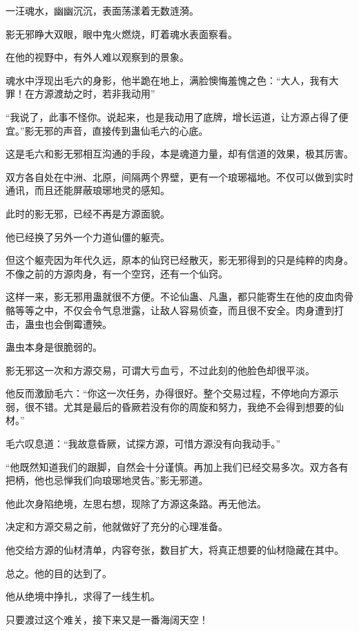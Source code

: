 
\begin{this_body}

一汪魂水，幽幽沉沉，表面荡漾着无数涟漪。

影无邪睁大双眼，眼中鬼火燃烧，盯着魂水表面察看。

在他的视野中，有外人难以观察到的景象。

魂水中浮现出毛六的身影，他半跪在地上，满脸懊悔羞愧之色：“大人，我有大罪！在方源渡劫之时，若非我动用”

“我说了，此事不怪你。说起来，也是我动用了底牌，增长运道，让方源占得了便宜。”影无邪的声音，直接传到蛊仙毛六的心底。

这是毛六和影无邪相互沟通的手段，本是魂道力量，却有信道的效果，极其厉害。

双方各自处在中洲、北原，间隔两个界壁，更有一个琅琊福地。不仅可以做到实时通讯，而且还能屏蔽琅琊地灵的感知。

此时的影无邪，已经不再是方源面貌。

他已经换了另外一个力道仙僵的躯壳。

但这个躯壳因为年代久远，原本的仙窍已经散灭，影无邪得到的只是纯粹的肉身。不像之前的方源肉身，有一个空窍，还有一个仙窍。

这样一来，影无邪用蛊就很不方便。不论仙蛊、凡蛊，都只能寄生在他的皮血肉骨骼等等之中，不仅会令气息泄露，让敌人容易侦查，而且很不安全。肉身遭到打击，蛊虫也会倒霉遭殃。

蛊虫本身是很脆弱的。

影无邪这一次和方源交易，可谓大亏血亏，不过此刻的他脸色却很平淡。

他反而激励毛六：“你这一次任务，办得很好。整个交易过程，不停地向方源示弱，很不错。尤其是最后的昏厥若没有你的周旋和努力，我绝不会得到想要的仙材。”

毛六叹息道：“我故意昏厥，试探方源，可惜方源没有向我动手。”

“他既然知道我们的跟脚，自然会十分谨慎。再加上我们已经交易多次。双方各有把柄，他也忌惮我们向琅琊地灵告。”影无邪道。

他此次身陷绝境，左思右想，现除了方源这条路。再无他法。

决定和方源交易之前，他就做好了充分的心理准备。

他交给方源的仙材清单，内容夸张，数目扩大，将真正想要的仙材隐藏在其中。

总之。他的目的达到了。

他从绝境中挣扎，求得了一线生机。

只要渡过这个难关，接下来又是一番海阔天空！


\end{this_body}
